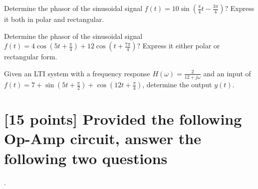 \documentclass[12pt,letterpaper, onecolumn]{exam}
\begin{document}
\begin{questions}

    \question[5 points] Determine the phasor of the sinusoidal signal \begin{math}f(t) = 10\sin{(\frac{\pi}{4}t - \frac{3\pi}{4})}\end{math}? Express it both in polar and rectangular. \droppoints


    
    
    \begin{solution}
    \end{solution}
    
    \question[5 points] Determine the phasor of the sinusoidal signal \begin{math}f(t) = 4\cos{(5t + \frac{\pi}{4})} + 12\cos{(t + \frac{7\pi}{4})}\end{math}? Express it either polar or rectangular form. \droppoints
    
    \begin{solution}
    \end{solution}


    \question[25 points] Given an LTI system with a frequency response \begin{math}
        H(\omega) = \frac{2}{12 + j\omega}
    \end{math} and an input of \begin{math}
        f(t) = 7 + \sin{(5t + \frac{\pi}{2})} + \cos{(12t + \frac{\pi}{4})}
    \end{math}, determine the output \begin{math}y(t)\end{math}. \droppoints
    
    \begin{solution}
    \end{solution}

    

\end{questions}

\section{[15 points] Provided the following Op-Amp circuit, answer the following two questions}.
\end{document}
